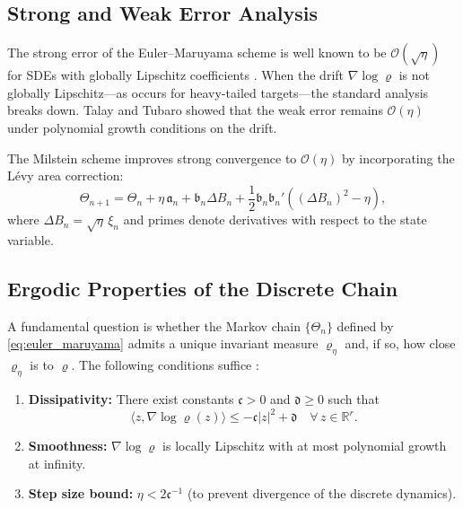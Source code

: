 \documentclass[journal]{IEEEtran}
\begin{document}
\subsection{Strong and Weak Error Analysis}

The strong error of the Euler--Maruyama scheme is well known to be $\mathcal{O}(\sqrt{\eta})$ for SDEs with globally Lipschitz coefficients \cite{kloeden1992}. When the drift $\nabla \log \varrho$ is not globally Lipschitz---as occurs for heavy-tailed targets---the standard analysis breaks down. Talay and Tubaro \cite{talay1990} showed that the weak error remains $\mathcal{O}(\eta)$ under polynomial growth conditions on the drift.

The Milstein scheme improves strong convergence to $\mathcal{O}(\eta)$ by incorporating the L\'{e}vy area correction:
\begin{equation}\label{eq:milstein}
  \Theta_{n+1} = \Theta_n + \eta\, \mathfrak{a}_n + \mathfrak{b}_n \Delta B_n + \frac{1}{2}\mathfrak{b}_n \mathfrak{b}_n' \left((\Delta B_n)^2 - \eta\right),
\end{equation}
where $\Delta B_n = \sqrt{\eta}\, \xi_n$ and primes denote derivatives with respect to the state variable.

\subsection{Ergodic Properties of the Discrete Chain}

A fundamental question is whether the Markov chain $\{\Theta_n\}$ defined by \eqref{eq:euler_maruyama} admits a unique invariant measure $\varrho_\eta$ and, if so, how close $\varrho_\eta$ is to $\varrho$. The following conditions suffice \cite{ross2014, norris1997}:

\begin{enumerate}
  \item \textbf{Dissipativity:} There exist constants $\mathfrak{c} > 0$ and $\mathfrak{d} \geq 0$ such that
  \begin{equation}
    \langle z, \nabla \log \varrho(z)\rangle \leq -\mathfrak{c}|z|^2 + \mathfrak{d} \quad \forall\, z \in \mathbb{R}^r.
  \end{equation}
  \item \textbf{Smoothness:} $\nabla \log \varrho$ is locally Lipschitz with at most polynomial growth at infinity.
  \item \textbf{Step size bound:} $\eta < 2\mathfrak{c}^{-1}$ (to prevent divergence of the discrete dynamics).
\end{enumerate}
\end{document}
